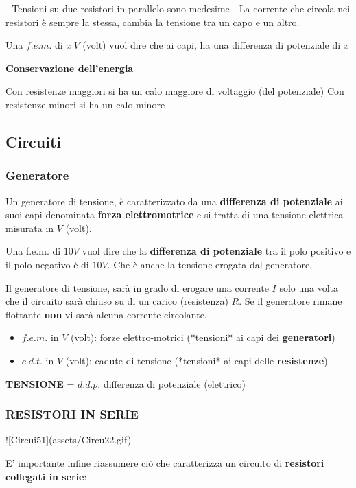 \documentclass{article}
\begin{document}
- Tensioni su due resistori in parallelo sono medesime
- La corrente che circola nei resistori è sempre la stessa, cambia la tensione tra un capo e un altro.

Una $f.e.m.$ di $x\ V$ (volt) vuol dire che ai capi, ha una differenza di potenziale di $x$

\textbf{Conservazione dell'energia}

Con resistenze maggiori si ha un calo maggiore di voltaggio (del potenziale)
Con resistenze minori si ha un calo minore


\subsection{Circuiti}
\subsubsection{Generatore}

Un generatore di tensione, è caratterizzato da una \textbf{differenza di potenziale} ai suoi capi denominata \textbf{forza elettromotrice} e si tratta di una tensione elettrica misurata in $V$ (volt).

Una f.e.m. di $10V$ vuol dire che la \textbf{differenza di potenziale} tra il polo positivo e il polo negativo è di $10V$. Che è anche la tensione erogata dal generatore.

Il generatore di tensione, sarà in grado di erogare una corrente $I$ solo una volta che il circuito sarà chiuso su di un carico (resistenza) $R$. 
Se il generatore rimane flottante \textbf{non} vi sarà alcuna corrente circolante.
\begin{itemize}
  \item $f.e.m.$ in $V$ (volt): forze elettro-motrici (*tensioni* ai capi dei \textbf{generatori})
  \item $c.d.t.$ in $V$ (volt): cadute di tensione (*tensioni* ai capi delle \textbf{resistenze})
\end{itemize}


\textbf{TENSIONE} = $d.d.p.$ differenza di potenziale (elettrico)

\subsubsection{RESISTORI IN SERIE}

![Circui51](assets/Circu22.gif)


E' importante infine riassumere ciò che caratterizza un circuito di \textbf{resistori collegati in serie}:    
\end{document}
